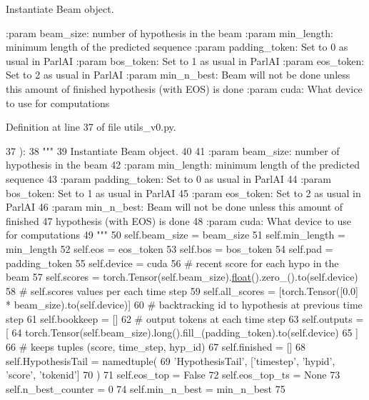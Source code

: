 \begin{DoxyVerb}Instantiate Beam object.

:param beam_size: number of hypothesis in the beam
:param min_length: minimum length of the predicted sequence
:param padding_token: Set to 0 as usual in ParlAI
:param bos_token: Set to 1 as usual in ParlAI
:param eos_token: Set to 2 as usual in ParlAI
:param min_n_best: Beam will not be done unless this amount of finished
           hypothesis (with EOS) is done
:param cuda: What device to use for computations
\end{DoxyVerb}
 

Definition at line 37 of file utils\+\_\+v0.\+py.


\begin{DoxyCode}
37     ):
38         \textcolor{stringliteral}{"""}
39 \textcolor{stringliteral}{        Instantiate Beam object.}
40 \textcolor{stringliteral}{}
41 \textcolor{stringliteral}{        :param beam\_size: number of hypothesis in the beam}
42 \textcolor{stringliteral}{        :param min\_length: minimum length of the predicted sequence}
43 \textcolor{stringliteral}{        :param padding\_token: Set to 0 as usual in ParlAI}
44 \textcolor{stringliteral}{        :param bos\_token: Set to 1 as usual in ParlAI}
45 \textcolor{stringliteral}{        :param eos\_token: Set to 2 as usual in ParlAI}
46 \textcolor{stringliteral}{        :param min\_n\_best: Beam will not be done unless this amount of finished}
47 \textcolor{stringliteral}{                           hypothesis (with EOS) is done}
48 \textcolor{stringliteral}{        :param cuda: What device to use for computations}
49 \textcolor{stringliteral}{        """}
50         self.beam\_size = beam\_size
51         self.min\_length = min\_length
52         self.eos = eos\_token
53         self.bos = bos\_token
54         self.pad = padding\_token
55         self.device = cuda
56         \textcolor{comment}{# recent score for each hypo in the beam}
57         self.scores = torch.Tensor(self.beam\_size).\hyperlink{namespaceprojects_1_1controllable__dialogue_1_1make__control__dataset_aa2b7207688c641dbc094ab44eca27113}{float}().zero\_().to(self.device)
58         \textcolor{comment}{# self.scores values per each time step}
59         self.all\_scores = [torch.Tensor([0.0] * beam\_size).to(self.device)]
60         \textcolor{comment}{# backtracking id to hypothesis at previous time step}
61         self.bookkeep = []
62         \textcolor{comment}{# output tokens at each time step}
63         self.outputs = [
64             torch.Tensor(self.beam\_size).long().fill\_(padding\_token).to(self.device)
65         ]
66         \textcolor{comment}{# keeps tuples (score, time\_step, hyp\_id)}
67         self.finished = []
68         self.HypothesisTail = namedtuple(
69             \textcolor{stringliteral}{'HypothesisTail'}, [\textcolor{stringliteral}{'timestep'}, \textcolor{stringliteral}{'hypid'}, \textcolor{stringliteral}{'score'}, \textcolor{stringliteral}{'tokenid'}]
70         )
71         self.eos\_top = \textcolor{keyword}{False}
72         self.eos\_top\_ts = \textcolor{keywordtype}{None}
73         self.n\_best\_counter = 0
74         self.min\_n\_best = min\_n\_best
75 
\end{DoxyCode}


